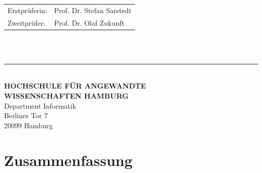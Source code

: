 \begin{titlepage}
  \hspace*{37mm}
  \begin{minipage}{0.5\linewidth}
    \begin{tabular}{@{}ll}
      Erstprüferin: & Prof. Dr. Stefan Sarstedt\\[-.3mm]
      Zweitprüfer: & Prof. Dr. Olaf Zukunft \\
    \end{tabular}\\

    \,\rule{9mm}{1mm}\\[1.5mm]

    \textbf{HOCHSCHULE FÜR ANGEWANDTE}\\
    \textbf{WISSENSCHAFTEN HAMBURG}\\
    Department Informatik\\
    Berliner Tor 7\\
    20099 Hamburg
  \end{minipage}
\end{titlepage}
\restoregeometry

\thispagestyle{empty}
\section*{Zusammenfassung}


